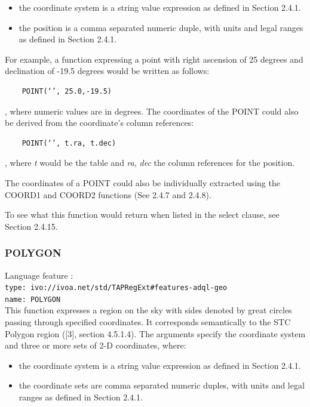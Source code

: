 \documentclass[11pt,a4paper]{ivoa}
\begin{document}
\begin{itemize}
    \item the coordinate system is a string value expression as defined in Section 2.4.1.
    \item the position is a comma separated numeric duple, with units and legal ranges as defined in Section 2.4.1.
\end{itemize}

For example, a function expressing a point with right ascension of 25 degrees
and declination of -19.5 degrees would be written as follows:

\begin{verbatim}
    POINT(‘’, 25.0,-19.5)
\end{verbatim}

, where numeric values are in degrees. The coordinates of the POINT could
also be derived from the coordinate’s column references:

\begin{verbatim}
    POINT(‘’, t.ra, t.dec)
\end{verbatim}
    
, where \textit{t} would be the table and \textit{ra}, \textit{dec} the
column references for the position.

The coordinates of a POINT could also be individually extracted using the
COORD1 and COORD2 functions (See 2.4.7 and 2.4.8).

To see what this function would return when listed in the select clause,
see Section 2.4.15.

\subsubsection{POLYGON}
\label{sec:geom.functions.polygon}
{\footnotesize Language feature :}\\
{\footnotesize \verb|type: ivo://ivoa.net/std/TAPRegExt#features-adql-geo|}\\
{\footnotesize \verb|name: POLYGON|}\\

This function expresses a region on the sky with sides denoted by great
circles passing through specified coordinates. It corresponds semantically
to the STC Polygon region ([3], section 4.5.1.4). The arguments specify the
coordinate system and three or more sets of 2-D coordinates, where:

\begin{itemize}
    \item the coordinate system is a string value expression as defined in Section 2.4.1.
    \item the coordinate sets are comma separated numeric duples, with units and legal ranges as defined in Section 2.4.1.
\end{itemize}
\end{document}
